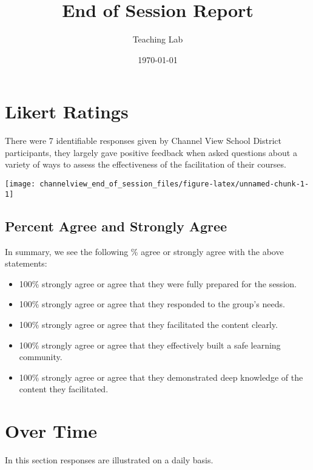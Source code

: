 \documentclass[10,a4paperpaper,]{article}
\title{End of Session Report}
\author{Teaching Lab}
\date{\today}
\begin{document}
\renewcommand{\contentsname}{Table of Contents}

\renewcommand{\pagename}{Page}


\maketitle
\tableofcontents
{}
\clearpage

\section{Likert Ratings}

There were 7 identifiable responses given by Channel View School
District participants, they largely gave positive feedback when asked
questions about a variety of ways to assess the effectiveness of the
facilitation of their courses.

\begin{center}\texttt{[image: channelview\_end\_of\_session\_files/figure-latex/unnamed-chunk-1-1]} \end{center}

\subsection{Percent Agree and Strongly Agree}

In summary, we see the following \% agree or strongly agree with the
above statements:

\begin{itemize}
\tightlist
\item
  100\% strongly agree or agree that they were fully prepared for the
  session.
\item
  100\% strongly agree or agree that they responded to the group's
  needs.
\item
  100\% strongly agree or agree that they facilitated the content
  clearly.
\item
  100\% strongly agree or agree that they effectively built a safe
  learning community.
\item
  100\% strongly agree or agree that they demonstrated deep knowledge of
  the content they facilitated.
\end{itemize}

\section{Over Time}

In this section responses are illustrated on a daily basis.
\end{document}
